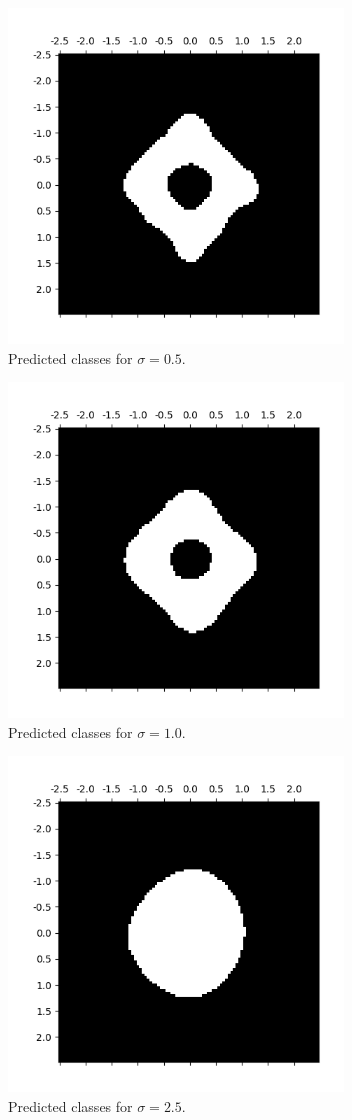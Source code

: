 \begin{figure}[h]
    \centering
    \includegraphics[height=3.5in]{Figure_2_5.png}
    \caption{Predicted classes for $\sigma = 0.5$.}
\end{figure}
\begin{figure}[h]
    \centering
    \includegraphics[height=3.5in]{Figure_2_6.png}
    \caption{Predicted classes for $\sigma = 1.0$.}
\end{figure}
\begin{figure}[h]
    \centering
    \includegraphics[height=3.5in]{Figure_2_7.png}
    \caption{Predicted classes for $\sigma = 2.5$.}
\end{figure}
\clearpage